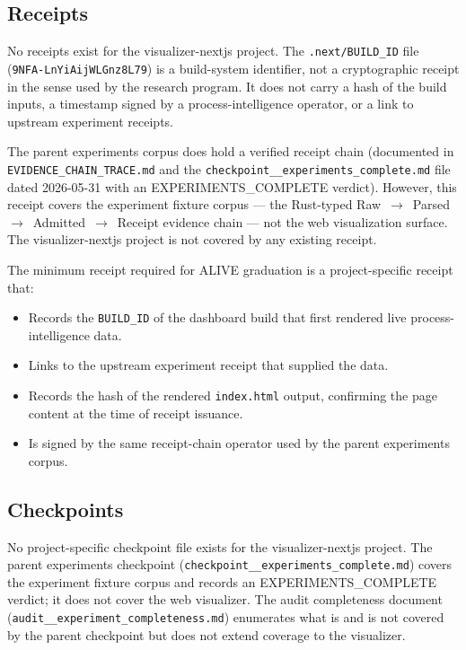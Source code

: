 \subsection{Receipts}
\label{sec:experiments-visualizer-nextjs-evidence-receipts}

No receipts exist for the visualizer-nextjs project. The \texttt{.next/BUILD\_ID} file
(\texttt{9NFA-LnYiAijWLGnz8L79}) is a build-system identifier, not a cryptographic receipt
in the sense used by the research program. It does not carry a hash of the build inputs,
a timestamp signed by a process-intelligence operator, or a link to upstream experiment
receipts.

The parent experiments corpus does hold a verified receipt chain (documented in
\texttt{EVIDENCE\_CHAIN\_TRACE.md} and the \texttt{checkpoint\_\_experiments\_complete.md}
file dated 2026-05-31 with an EXPERIMENTS\_COMPLETE verdict). However, this receipt covers
the experiment fixture corpus --- the Rust-typed Raw~$\to$~Parsed~$\to$~Admitted~$\to$~Receipt
evidence chain --- not the web visualization surface. The visualizer-nextjs project is not
covered by any existing receipt.

The minimum receipt required for ALIVE graduation is a project-specific receipt that:
\begin{itemize}
  \item Records the \texttt{BUILD\_ID} of the dashboard build that first rendered
        live process-intelligence data.
  \item Links to the upstream experiment receipt that supplied the data.
  \item Records the hash of the rendered \texttt{index.html} output, confirming the
        page content at the time of receipt issuance.
  \item Is signed by the same receipt-chain operator used by the parent experiments corpus.
\end{itemize}

\subsection{Checkpoints}
\label{sec:experiments-visualizer-nextjs-evidence-checkpoints}

No project-specific checkpoint file exists for the visualizer-nextjs project. The parent
experiments checkpoint (\texttt{checkpoint\_\_experiments\_complete.md}) covers the experiment
fixture corpus and records an EXPERIMENTS\_COMPLETE verdict; it does not cover the web
visualizer. The audit completeness document (\texttt{audit\_\_experiment\_completeness.md})
enumerates what is and is not covered by the parent checkpoint but does not extend coverage
to the visualizer.

